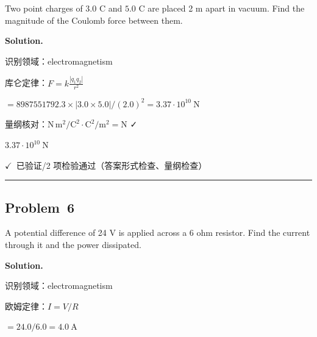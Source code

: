 \documentclass[12pt, a4paper]{article}
\newcommand{\problem}[1]{\subsection*{Problem~#1}}
\newcommand{\solution}{%
  \par\noindent
  {\color{solutiongreen}\bfseries Solution.}\par
}
\newcommand{\verifyok}{\textcolor{solutiongreen}{\ensuremath{\checkmark}\ 已验证}}
\begin{document}
\begin{stepbox}
Two point charges of $3.0$ C and $5.0$ C are placed 2 m apart in vacuum.
Find the magnitude of the Coulomb force between them.
\end{stepbox}

\solution

\begin{stepbox}
识别领域：electromagnetism
\end{stepbox}

\begin{stepbox}
库仑定律：$F = k\frac{|q_1q_2|}{r^2}$
\end{stepbox}

\begin{stepbox}
$= 8987551792.3\times|3.0\times5.0|/(2.0)^2 = 3.37 \cdot 10^{10}\ \mathrm{N}$
\end{stepbox}

\begin{stepbox}
量纲核对：$\mathrm{N\,m^2/C^2}\cdot\mathrm{C^2/m^2} = \mathrm{N}$ ✓
\end{stepbox}

\begin{center}
$\boxed{3.37 \cdot 10^{10}\ \mathrm{N}}$
\end{center}

\begin{verifybox}\small \verifyok{}/2 项检验通过（答案形式检查、量纲检查） \end{verifybox}

\vspace{0.8em}\hrule\vspace{0.8em}

\problem{6}

\begin{stepbox}
A potential difference of 24 V is applied across a 6 ohm resistor.
Find the current through it and the power dissipated.
\end{stepbox}

\solution

\begin{stepbox}
识别领域：electromagnetism
\end{stepbox}

\begin{stepbox}
欧姆定律：$I = V/R$
\end{stepbox}

\begin{stepbox}
$= 24.0/6.0 = 4.0\ \mathrm{A}$
\end{stepbox}
\end{document}
